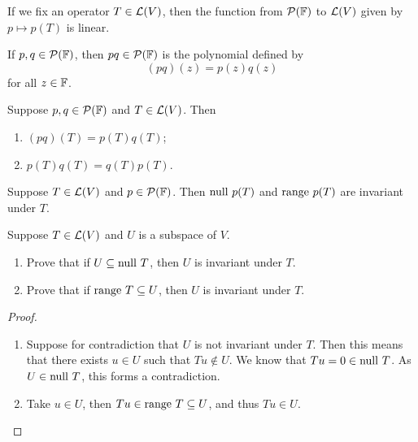 \documentclass{extarticle}
\begin{document}
\begin{remark}
    If we fix an operator \(T \in \mathcal{L}(V)\), then the function from \(\mathcal{P}(\mathbb{F})\) to \(\mathcal{L}(V)\)
    given by \(p \mapsto p(T)\) is linear. 
\end{remark}


\begin{definition}
    If \(p, q \in \mathcal{P}(\mathbb{F})\), then \(pq \in \mathcal{P}(\mathbb{F})\) is the polynomial defined by 
    \[(pq)(z) = p(z)q(z)\]
    for all \(z \in \mathbb{F}\).
\end{definition}

\begin{thm}
    Suppose \(p, q \in \mathcal{P}(\mathbb{F})\) and \(T \in \mathcal{L}(V)\). Then 
    \begin{enumerate}[label=(\alph*)]
        \item \((pq)(T) = p(T) q(T)\);
        \item \(p(T)q(T) = q(T)p(T)\).
    \end{enumerate}
\end{thm}

\begin{definition}
    Suppose \(T \in \mathcal{L}(V)\) and \(p \in \mathcal{P}(\mathbb{F})\). Then \(\text{null } p(T)\) and \(\text{range } p(T)\)
    are invariant under \(T\).
\end{definition}







\newpage 
{}

\begin{problem}{1}
    Suppose \(T \in \mathcal{L}(V)\) and \(U\) is a subspace of \(V\). 
    \begin{enumerate}[label=(\alph*)]
        \item Prove that if \(U \subseteq \text{null } T\), then \(U\) is invariant under \(T\). 
        \item Prove that if \(\text{range } T \subseteq U\), then \(U\) is invariant under \(T\).
    \end{enumerate}
\end{problem}

\begin{proof}
\begin{enumerate}[label=(\alph*)]
    \item  Suppose for contradiction that \(U\) is not invariant under \(T\). Then this means 
    that there exists \(u \in U\) such that \(T u \notin U\). We know that \(Tu = 0 \in \text{null } T\). 
    As \(U \in \text{null } T\), this forms a contradiction. 
    
    \item Take \(u \in U\), then \(Tu \in \text{range } T \subseteq U\), and thus \(Tu \in U\).
\end{enumerate}
\end{proof}
\end{document}
